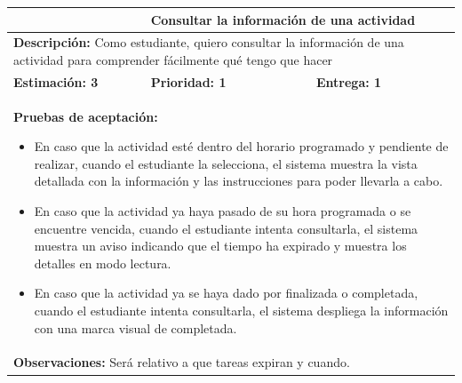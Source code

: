 \begin{table}[H]
\centering
{}
\begin{tabularx}{\textwidth}{|X|X|X|}
\hline
\rowcolor{azulclaro}
\multicolumn{1}{|l|}{\textbf{Identificador:} HU-E3} & \multicolumn{2}{l|}{\textbf{Consultar la información de una actividad}} \\ \hline
\multicolumn{3}{|p{\dimexpr\textwidth-2\tabcolsep-2\arrayrulewidth}|}{\textbf{Descripción:} Como estudiante, quiero consultar la información de una actividad para comprender fácilmente qué tengo que hacer} \\ \hline
\rowcolor{white}
\textbf{Estimación: 3} & \textbf{Prioridad: 1} & \textbf{Entrega: 1} \\ \hline
\multicolumn{3}{|p{\dimexpr\textwidth-2\tabcolsep-2\arrayrulewidth}|}{%
\textbf{Pruebas de aceptación:}
\begin{itemize}[leftmargin=1.5em, itemsep=2pt, topsep=3pt]
    \item En caso que la actividad esté dentro del horario programado y pendiente de realizar, cuando el estudiante la selecciona, el sistema muestra la vista detallada con la información y las instrucciones para poder llevarla a cabo.
    \item En caso que la actividad ya haya pasado de su hora programada o se encuentre vencida, cuando el estudiante intenta consultarla, el sistema muestra un aviso indicando que el tiempo ha expirado y muestra los detalles en modo lectura.
    \item En caso que la actividad ya se haya dado por finalizada o completada, cuando el estudiante intenta consultarla, el sistema despliega la información con una marca visual de completada.
\end{itemize}
} \\ \hline
\multicolumn{3}{|p{\dimexpr\textwidth-2\tabcolsep-2\arrayrulewidth}|}{\textbf{Observaciones:} Será relativo a que tareas expiran y cuando.} \\ \hline
\end{tabularx}
\end{table}

\vspace{0.4cm}

